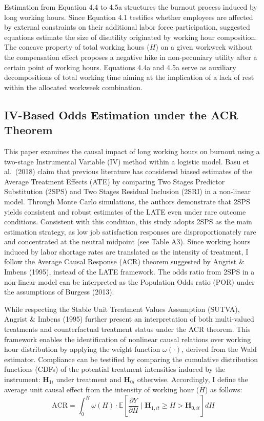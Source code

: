 \documentclass[
  12pt,
]{article}
\begin{document}
Estimation from Equation 4.4 to 4.5a structures the burnout process
induced by long working hours. Since Equation 4.1 testifies whether
employees are affected by external constraints on their additional labor
force participation, suggested equations estimate the size of disutility
originated by working hour composition. The concave property of total
working hours (\(H\)) on a given workweek without the compensation
effect proposes a negative hike in non-pecuniary utility after a certain
point of working hours. Equations 4.4a and 4.5a serve as auxiliary
decompositions of total working time aiming at the implication of a lack
of rest within the allocated workweek combination.

\subsection{IV-Based Odds Estimation under the ACR
Theorem}\label{iv-based-odds-estimation-under-the-acr-theorem}

This paper examines the causal impact of long working hours on burnout
using a two-stage Instrumental Variable (IV) method within a logistic
model. Basu et al.~(2018) claim that previous literature has considered
biased estimates of the Average Treatment Effects (ATE) by comparing Two
Stages Predictor Substitution (2SPS) and Two Stages Residual Inclusion
(2SRI) in a non-linear model. Through Monte Carlo simulations, the
authors demonstrate that 2SPS yields consistent and robust estimates of
the LATE even under rare outcome conditions. Consistent with this
condition, this study adopts 2SPS as the main estimation strategy, as
low job satisfaction responses are disproportionately rare and
concentrated at the neutral midpoint (see Table A3). Since working hours
induced by labor shortage rates are translated as the intensity of
treatment, I follow the Average Causal Response (ACR) theorem suggested
by Angrist \& Imbens (1995), instead of the LATE framework. The odds
ratio from 2SPS in a non-linear model can be interpreted as the
Population Odds ratio (POR) under the assumptions of Burgess (2013).

While respecting the Stable Unit Treatment Values Assumption (SUTVA),
Angrist \& Imbens (1995) further present an interpretation of both
multi-valued treatments and counterfactual treatment status under the
ACR theorem. This framework enables the identification of nonlinear
causal relations over working hour distribution by applying the weight
function \(\omega(\cdot)\), derived from the Wald estimator. Compliance
can be testified by comparing the cumulative distribution functions
(CDFs) of the potential treatment intensities induced by the instrument:
\(\mathbf{H}_{1i}\) under treatment and \(\mathbf{H}_{0i}\) otherwise.
Accordingly, I define the average unit causal effect from the intensity
of working hour (\(\bar{H}\)) as follows: \[
\text{ACR} = \int_{0}^{\bar{H}}\omega(H)\cdot\mathbb{E}[\frac{\partial{Y}}{\partial{H}} \mid \mathbf{H}_{1,it} \geq H> \mathbf{H}_{0,it}]dH
\]
\end{document}
